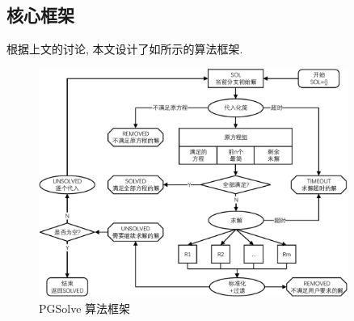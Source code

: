 \subsection{核心框架}

根据上文的讨论, 本文设计了如所示的算法框架.

\begin{figure}[h]
\centering 
\includegraphics[width=0.9\textwidth]{fig/pgsolve.pdf}
\caption{PGSolve 算法框架}\label{PGSolve}
\end{figure}

